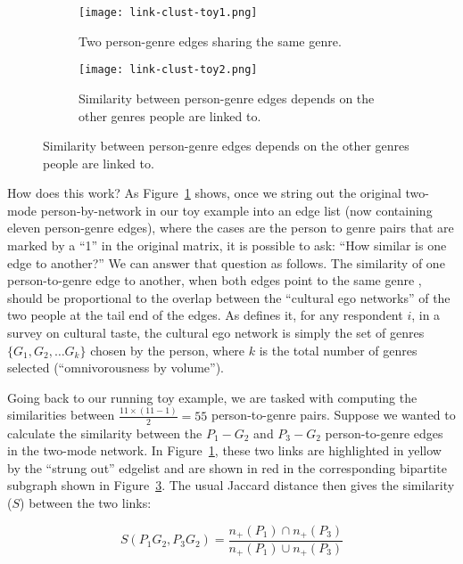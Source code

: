\documentclass[a4paper,12pt]{article}
\begin{document}
\begin{figure}[t!]
    \captionsetup[subfigure]{font=footnotesize,labelfont=footnotesize}
     \centering
     \begin{subfigure}[b]{0.6\textwidth}
        \texttt{[image: link-clust-toy1.png]}
        \caption{Two person-genre edges sharing the same genre.}
        \label{fig:link-toy1}
    \end{subfigure} 
     \begin{subfigure}[b]{0.3\textwidth}
        \texttt{[image: link-clust-toy2.png]}
        \caption{Similarity between person-genre edges depends on the other genres people are linked to.}
        \label{fig:link-toy2}
    \end{subfigure}
\end{figure}
 
How does this work? As Figure~\ref{fig:link-toy1} shows, once we string out the original two-mode person-by-network in our toy example into an edge list (now containing eleven person-genre edges), where the cases are the person to genre pairs that are marked by a ``1'' in the original matrix, it is possible to ask: ``How similar is one edge to another?'' We can answer that question as follows. The similarity of one person-to-genre edge to another, when both edges point to the same genre \citep{ahn_etal10}, should be proportional to the overlap between the ``cultural ego networks'' of the two people at the tail end of the edges. As \citet{lizardo14} defines it, for any respondent $i$, in a survey on cultural taste, the cultural ego network is simply the set of genres $\{G_1, G_2,\dots G_k\}$ chosen by the person, where $k$ is the total number of genres selected (``omnivorousness by volume''). 

Going back to our running toy example, we are tasked with computing the similarities between $\frac{11 \times (11-1)}{2} = 55$ person-to-genre pairs. Suppose we wanted to calculate the similarity between the $P_1-G_2$ and $P_3-G_2$ person-to-genre edges in the two-mode network. In Figure~\ref{fig:link-toy1}, these two links are highlighted in yellow by the ``strung out'' edgelist and are shown in red in the corresponding bipartite subgraph shown in Figure~\ref{fig:link-toy2}. The usual Jaccard distance then gives the similarity ($S$) between the two links:

\begin{equation}
    S(P_1G_2, P_3G_2) = \frac{n_+(P_1) \cap n_+(P_3)}{n_+(P_1) \cup n_+(P_3)}
\end{equation}
\end{document}
